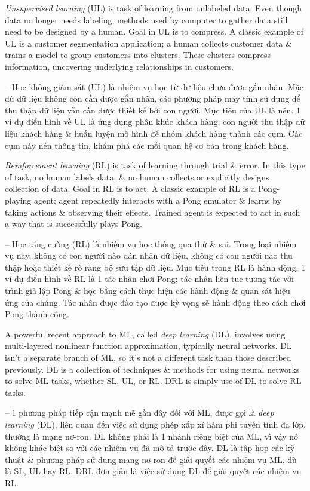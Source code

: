 \documentclass{article}
\begin{document}
\begin{itemize}
\begin{itemize}
\begin{itemize}
            {\it Unsupervised learning} (UL) is task of learning from unlabeled data. Even though data no longer needs labeling, methods used by computer to gather data still need to be designed by a human. Goal in UL is to compress. A classic example of UL is a customer segmentation application; a human collects customer data \& trains a model to group customers into clusters. These clusters compress information, uncovering underlying relationships in customers.

            -- Học không giám sát (UL) là nhiệm vụ học từ dữ liệu chưa được gắn nhãn. Mặc dù dữ liệu không còn cần được gắn nhãn, các phương pháp máy tính sử dụng để thu thập dữ liệu vẫn cần được thiết kế bởi con người. Mục tiêu của UL là nén. 1 ví dụ điển hình về UL là ứng dụng phân khúc khách hàng; con người thu thập dữ liệu khách hàng \& huấn luyện mô hình để nhóm khách hàng thành các cụm. Các cụm này nén thông tin, khám phá các mối quan hệ cơ bản trong khách hàng.

            {\it Reinforcement learning} (RL) is task of learning through trial \& error. In this type of task, no human labels data, \& no human collects or explicitly designs collection of data. Goal in RL is to act. A classic example of RL is a Pong-playing agent; agent repeatedly interacts with a Pong emulator \& learns by taking actions \& observing their effects. Trained agent is expected to act in such a way that is successfully plays Pong.

            -- Học tăng cường (RL) là nhiệm vụ học thông qua thử \& sai. Trong loại nhiệm vụ này, không có con người nào dán nhãn dữ liệu, không có con người nào thu thập hoặc thiết kế rõ ràng bộ sưu tập dữ liệu. Mục tiêu trong RL là hành động. 1 ví dụ điển hình về RL là 1 tác nhân chơi Pong; tác nhân liên tục tương tác với trình giả lập Pong \& học bằng cách thực hiện các hành động \& quan sát hiệu ứng của chúng. Tác nhân được đào tạo được kỳ vọng sẽ hành động theo cách chơi Pong thành công.

            A powerful recent approach to ML, called {\it deep learning} (DL), involves using multi-layered nonlinear function approximation, typically neural networks. DL isn't a separate branch of ML, so it's not a different task than those described previously. DL is a collection of techniques \& methods for using neural networks to solve ML tasks, whether SL, UL, or RL. DRL is simply use of DL to solve RL tasks.

            -- 1 phương pháp tiếp cận mạnh mẽ gần đây đối với ML, được gọi là {\it deep learning} (DL), liên quan đến việc sử dụng phép xấp xỉ hàm phi tuyến tính đa lớp, thường là mạng nơ-ron. DL không phải là 1 nhánh riêng biệt của ML, vì vậy nó không khác biệt so với các nhiệm vụ đã mô tả trước đây. DL là tập hợp các kỹ thuật \& phương pháp sử dụng mạng nơ-ron để giải quyết các nhiệm vụ ML, dù là SL, UL hay RL. DRL đơn giản là việc sử dụng DL để giải quyết các nhiệm vụ RL.


\end{itemize}
\end{itemize}
\end{itemize}
\end{document}
